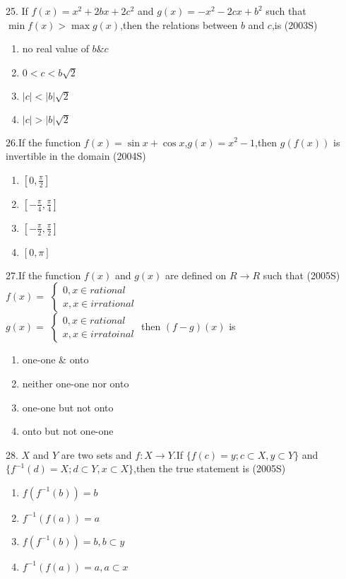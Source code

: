 \documentclass[journal,12pt,twocolumn]{IEEEtran}
\theoremstyle{remark}
\begin{document}
25. If $f(x)=x^2+2bx+2c^2$ and $g(x)=-x^2-2cx+b^2$ such that $\min f(x)> \max g(x)$,then the relations between $b$ and $c$,is
\hfill(2003S)\\
\begin{enumerate}
    \item no real value of $b\& c$
    \item $0<c<b\sqrt{2}$
    \item $|c|<|b|\sqrt{2}$
    \item $|c|>|b|\sqrt{2}$
\end{enumerate}
26.If the function $f(x)=\sin x+\cos x$,$g(x)=x^2-1$,then $g(f(x))$ is invertible in the domain 
\hfill(2004S)\\
\begin{enumerate}
    \item $\left[0,\frac{\pi}{2}\right]$\\
    \item $\left[-\frac{\pi}{4},\frac{\pi}{4}\right]$\\
    \item $\left[-\frac{\pi}{2},\frac{\pi}{2}\right]$\\
    \item $[0,\pi]$
\end{enumerate}
27.If the function $f(x)$ and $g(x)$ are defined on $R \rightarrow R $ such that
\hfill(2005S)
\\$f(x)=$
$ \begin{cases}
    0, x \in rational\\
    x, x \in irrational 
\end{cases} $ \\
    $g(x)=$
$\begin{cases}
    0,x \in rational\\
    x,x \in irratoinal
\end{cases}$
then $(f-g)(x)$ is 
\begin{enumerate}
    \item one-one \& onto 
    \item neither one-one nor onto
    \item one-one but not onto 
    \item onto but not one-one
\end{enumerate}
28. $X$ and $Y$ are two sets and $f:X\rightarrow Y$.If $ \{f(c)=y;c \subset X,y \subset Y\} $ and $ \{f^{-1}(d)=X;d \subset Y,x \subset X \} $,then the true statement is 
\hfill(2005S)\\
\begin{enumerate}
    \item $f(f^{-1}(b))=b$
    \item $f^{-1}(f(a))=a$
    \item $f(f^{-1}(b))=b,b \subset y$
    \item $f^{-1}(f(a))=a,a \subset x$
\end{enumerate}
\end{document}

